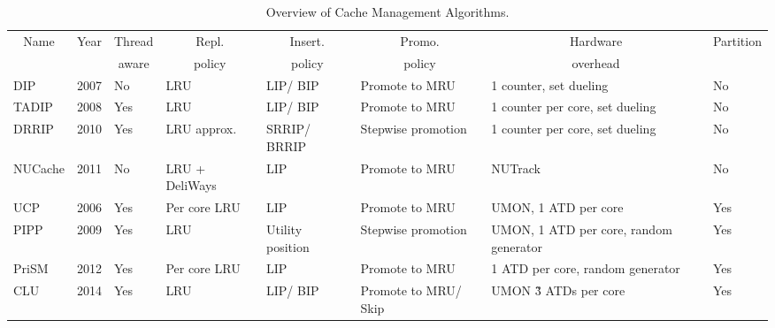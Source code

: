 \begin{table}[thb]
\begin{tabular}{|p{1.4cm}|p{0.5cm}|p{0.8cm}|p{1.2cm}|p{1.2cm}|p{1.4cm}|p{1.2cm}|p{1.0cm}|}
\hline
\multicolumn{1}{|c|}{Name} & \multicolumn{1}{c|}{Year} & \multicolumn{1}{c|}{Thread} & \multicolumn{1}{c|}{Repl.} & \multicolumn{1}{c|}{Insert.} & \multicolumn{1}{c|}{Promo.} & \multicolumn{1}{c|}{Hardware}    & \multicolumn{1}{c|}{Partition}     \\
\multicolumn{1}{|c|}{}          & \multicolumn{1}{c|}{}          & \multicolumn{1}{c|}{aware}  & \multicolumn{1}{c|}{policy}      & \multicolumn{1}{c|}{policy}    & \multicolumn{1}{c|}{policy}    & \multicolumn{1}{c|}{overhead\footnotemark}  & \multicolumn{1}{c|}{}       \\ \hline
DIP                             & 2007                           & No                          & LRU                              & LIP/ BIP                        & Promote to MRU            & 1 counter, set dueling    & No            \\ \hline
TADIP                           & 2008                          & Yes                         & LRU                              & LIP/ BIP                        & Promote to MRU            & 1 counter per core, set dueling  & No          \\ \hline
DRRIP                           & 2010                          & Yes                         & LRU approx.                      & SRRIP/ BRRIP                    & Stepwise promotion            & 1 counter per core, set dueling  & No          \\ \hline
NUCache                         & 2011                         & No                          & LRU + DeliWays     & LIP                            & Promote to MRU                 & NUTrack                            & No    \\ \hline
UCP                             & 2006                           & Yes                         & Per core LRU                     & LIP                            & Promote to MRU                 & UMON, 1 ATD per core   & Yes                \\ \hline
PIPP                            & 2009                           & Yes                         & LRU                              & Utility position               & Stepwise promotion            & UMON, 1 ATD per core, random generator & Yes \\ \hline
PriSM                           & 2012                           & Yes                         & Per core LRU                  & LIP                            & Promote to MRU                 & 1 ATD per core, random generator                       & Yes  \\ \hline
CLU                             & 2014                           & Yes                         & LRU                              & LIP/ BIP                        & Promote to MRU/ Skip            & UMON \~3 ATDs per core                & Yes  \\ \hline
\end{tabular}
\caption{Overview of Cache Management Algorithms.}
\label{tbl:algorithms}
\end{table}
\clearpage

